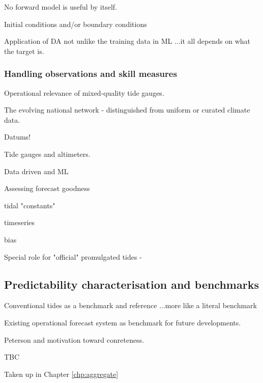 No forward model is useful by itself.

Initial conditions and/or boundary conditions 

Application of DA not unlike the training data in ML ...it all depends on what the target is.

\subsubsection{Handling observations and skill measures}
Operational relevance of mixed-quality tide gauges.

The evolving national network - distinguished from uniform or curated climate data.


Datums!

Tide gauges and altimeters.    


Data driven and ML


Assessing forecast goodness

tidal "constants"

timeseries

bias

Special role for "official" promulgated tides -

\subsection{Predictability characterisation and benchmarks}

Conventional tides as a benchmark and reference ...more like a literal benchmark


Existing operational forecast system as benchmark for future developments.


Peterson and motivation toward conreteness.


TBC

Taken up in Chapter \ref{chp:aggregate}




